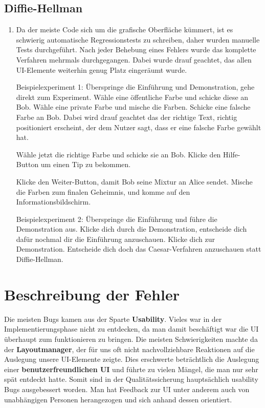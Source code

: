 \documentclass{article}
\begin{document}
  \subsection{Diffie-Hellman}
  \begin{enumerate}
      \item Da der meiste Code sich um die grafische Oberfläche kümmert, ist es schwierig
          automatische Regressionstests zu schreiben, daher wurden manuelle Tests durchgeführt.
          Nach jeder Behebung eines Fehlers wurde das komplette Verfahren mehrmals durchgegangen.
          Dabei wurde drauf geachtet, das allen UI-Elemente weiterhin genug Platz eingeräumt wurde.

          Beispielexperiment 1:
          Überspringe die Einführung und Demonstration, gehe direkt zum Experiment.
          Wähle eine öffentliche Farbe und schicke diese an Bob.
          Wähle eine private Farbe und mische die Farben. Schicke eine falsche
          Farbe an Bob. Dabei wird drauf geachtet das der richtige Text, richtig positioniert
          erscheint, der dem Nutzer sagt, dass er eine falsche Farbe gewählt hat.

          Wähle jetzt die richtige Farbe und schicke sie an Bob.
          Klicke den Hilfe-Button um einen Tip zu bekommen.
          
          Klicke den Weiter-Button, damit Bob seine Mixtur an Alice sendet.
          Mische die Farben zum finalen Geheimnis, und komme auf den Informationsbildschirm.

          Beispielexperiment 2:
          Überspringe die Einführung und führe die Demonstration aus.
          Klicke dich durch die Demonstration, entscheide dich dafür
          nochmal dir die Einführung anzuschauen. Klicke dich zur Demonstration.
          Entscheide dich doch das Caesar-Verfahren anzuschauen statt Diffie-Hellman.
      \end{enumerate}
\clearpage

\section{Beschreibung der Fehler}
  Die meisten Bugs kamen aus der Sparte \textbf{Usability}. Vieles war in der Implementierungsphase nicht zu entdecken, da man damit beschäftigt
  war die UI überhaupt zum funktionieren zu bringen. Die meisten Schwierigkeiten machte da der \textbf{Layoutmanager}, der für uns oft nicht
  nachvollziehbare Reaktionen auf die Auslegung unsere UI-Elemente zeigte.\newline 
  Dies erschwerte beträchtlich die Auslegung einer \textbf{benutzerfreundlichen UI} und führte zu vielen Mängel, die man
  nur sehr spät entdeckt hatte. Somit sind in der Qualitätssicherung hauptsächlich usability Bugs ausgebessert worden. 
  Man hat Feedback zur UI unter anderem auch von unabhängigen Personen herangezogen und sich anhand dessen orientiert. 
  
\end{document}
